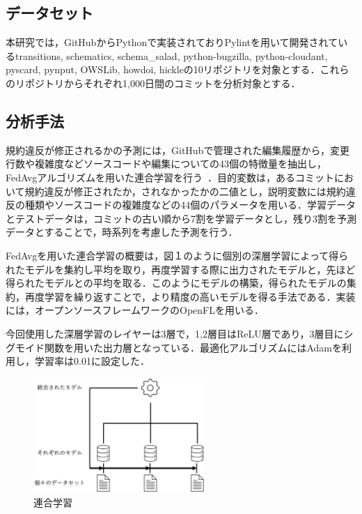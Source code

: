 \documentclass[uplatex,dvipdfmx,a4paper,twocolumn,base=11pt,jbase=11pt,ja=standard]{bxjsarticle}  %
\begin{document}
\subsection{データセット}
本研究では，GitHubからPythonで実装されておりPylintを用いて開発されているtransitions, schematics, schema\_salad, python-bugzilla, python-cloudant, pyscard, pynput, OWSLib, howdoi, hickleの10リポジトリを対象とする．これらのリポジトリからそれぞれ1,000日間のコミットを分析対象とする．

\subsection{分析手法}
規約違反が修正されるかの予測には，GitHubで管理された編集履歴から，変更行数や複雑度などソースコードや編集についての43個の特徴量を抽出し，FedAvgアルゴリズムを用いた連合学習を行う~\cite{article2}．目的変数は，あるコミットにおいて規約違反が修正されたか，されなかったかの二値とし，説明変数には規約違反の種類やソースコードの複雑度などの44個のパラメータを用いる．学習データとテストデータは，コミットの古い順から7割を学習データとし，残り3割を予測データとすることで，時系列を考慮した予測を行う．

FedAvgを用いた連合学習の概要は，図１のように個別の深層学習によって得られたモデルを集約し平均を取り，再度学習する際に出力されたモデルと，先ほど得られたモデルとの平均を取る．このようにモデルの構築，得られたモデルの集約，再度学習を繰り返すことで，より精度の高いモデルを得る手法である．実装には，オープンソースフレームワークのOpenFLを用いる．

今回使用した深層学習のレイヤーは3層で，1,2層目はReLU層であり，3層目にシグモイド関数を用いた出力層となっている．最適化アルゴリズムにはAdamを利用し，学習率は0.01に設定した．
\begin{figure}[t]
  \centering
  \includegraphics[width=6.5cm]{federated_learning_exp.eps}
  \caption{連合学習}
  \label{fig:test}
  \end{figure}

\end{document}
